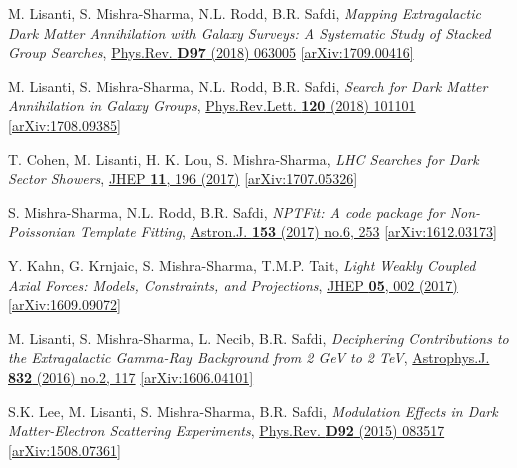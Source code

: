 \documentclass[11pt]{article}
\newenvironment{packed_enumerate}[1][]{
\begin{etaremune}[#1]
  \setlength{\itemsep}{3pt}
  \setlength{\parskip}{0pt}
  \setlength{\parsep}{0pt}}{\end{etaremune}
}
\begin{document}
\begin{packed_enumerate}[start=24]
\item M. Lisanti, S. Mishra-Sharma, N.L. Rodd, B.R. Safdi, \emph{Mapping Extragalactic Dark Matter Annihilation with Galaxy Surveys: A Systematic Study of Stacked Group Searches},  \href{https://journals.aps.org/prd/abstract/10.1103/PhysRevD.97.063005}{Phys.Rev. \textbf{D97} (2018) 063005} \href{https://arxiv.org/abs/1709.00416}{[arXiv:1709.00416]}

\item M. Lisanti, S. Mishra-Sharma, N.L. Rodd, B.R. Safdi, \emph{Search for Dark Matter Annihilation in Galaxy Groups},  \href{https://journals.aps.org/prl/abstract/10.1103/PhysRevLett.120.101101}{Phys.Rev.Lett. \textbf{120} (2018) 101101} \href{https://arxiv.org/abs/1708.09385}{[arXiv:1708.09385]}

\item T. Cohen, M. Lisanti, H. K. Lou, S. Mishra-Sharma, \emph{LHC Searches for Dark Sector Showers},  \href{https://link.springer.com/article/10.1007/JHEP11(2017)196}{JHEP \textbf{11}, 196 (2017)}  \href{https://arxiv.org/abs/1707.05326}{ [arXiv:1707.05326]}

\item S. Mishra-Sharma, N.L. Rodd, B.R. Safdi, \emph{NPTFit: A code package for Non-Poissonian Template Fitting},  \href{http://iopscience.iop.org/article/10.3847/1538-3881/aa6d5f/meta}{Astron.J. \textbf{153} (2017) no.6, 253}  \href{https://arxiv.org/abs/1612.03173}{ [arXiv:1612.03173]}

\item Y. Kahn, G. Krnjaic, S. Mishra-Sharma, T.M.P. Tait, \emph{Light Weakly Coupled Axial Forces: Models, Constraints, and Projections},  \href{https://link.springer.com/article/10.1007%2FJHEP05%282017%29002}{JHEP \textbf{05}, 002 (2017)}  \href{https://arxiv.org/abs/1609.09072}{[arXiv:1609.09072]}

\item M. Lisanti, S. Mishra-Sharma, L. Necib, B.R. Safdi, \emph{Deciphering Contributions to the Extragalactic Gamma-Ray Background from 2 GeV to 2 TeV},  \href{http://iopscience.iop.org/article/10.3847/0004-637X/832/2/117/meta}{Astrophys.J. \textbf{832} (2016) no.2, 117} \href{https://arxiv.org/abs/1606.04101}{[arXiv:1606.04101]}

\item S.K. Lee, M. Lisanti, S. Mishra-Sharma, B.R. Safdi, \emph{Modulation Effects in Dark Matter-Electron Scattering Experiments}, \href{https://journals.aps.org/prd/abstract/10.1103/PhysRevD.92.083517}{Phys.Rev. \textbf{D92} (2015) 083517} \href{https://arxiv.org/abs/1508.07361}{[arXiv:1508.07361]}
\end{packed_enumerate}
\end{document}
